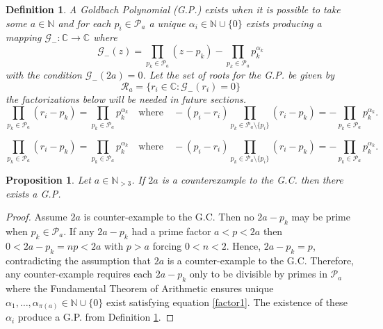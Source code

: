\documentclass[10pt,a4paper]{amsart}
\newtheorem{definition}{Definition}
\newtheorem{proposition}{Proposition}
\begin{document}
\begin{definition}\label{polyx}
A \textit{Goldbach Polynomial} (G.P.) exists when it is possible to take some $a \in \mathbb{N}$ and for each $p_i \in \mathcal{P}_a$ a unique $\alpha_i \in \mathbb{N} \cup \{0\}$ exists producing a mapping $\mathcal{G}_- : \mathbb{C} \to \mathbb{C}$ where  
\begin{equation}\label{roots}
 \mathcal{G}_-(z) = \prod_{p_k \in \mathcal{P}_a} (z - p_k) - \prod_{p_k \in \mathcal{P}_a}p_k^{\alpha_k}
 \end{equation}
 with the condition $\mathcal{G}_-(2a) = 0$. Let the set of roots for the G.P. be given by 
\begin{equation}\label{R}
\mathcal{R}_a = \{ r_i \in \mathbb{C} : \mathcal{G}_-(r_i) = 0 \}
\end{equation}
the factorizations below will be needed in future sections. 
 \begin{equation}\label{factor1}
 \prod_{p_k \in \mathcal{P}_a}(r_i - p_k) = \prod_{p_k \in \mathcal{P}_a}p_k^{\alpha_k} \quad \text{where} \quad -(p_i - r_i) \prod_{p_k \in \mathcal{P}_a \setminus\{p_i\}}(r_i - p_k) = -\prod_{p_k \in \mathcal{P}_a}p_k^{\alpha_k}.
 \end{equation}
\end{definition}

 \begin{equation}
 \prod_{p_k \in \mathcal{P}_a}(r_i - p_k) = \prod_{p_k \in \mathcal{P}_a}p_k^{\alpha_k} \quad \text{where} \quad -(p_i - r_i) \prod_{p_k \in \mathcal{P}_a \setminus\{p_i\}}(r_i - p_k) = -\prod_{p_k \in \mathcal{P}_a}p_k^{\alpha_k}.
 \end{equation}

\begin{proposition}\label{gbf}
\textit{Let $a \in \mathbb{N}_{> 3}$. If $2a$ is a counterexample to the G.C. then there exists a G.P.}
\end{proposition}

\begin{proof}
Assume $2a$ is counter-example to the G.C. Then no $2a - p_k$ may be prime when $p_k \in \mathcal{P}_a$. If any $2a - p_k$ had a prime factor $a < p < 2a$ then $0< 2a - p_k = n p < 2a$ with $p > a$ forcing $0<n < 2$. Hence, $2a - p_k = p$, contradicting the assumption that $2a$ is a counter-example to the G.C. Therefore, any counter-example requires each $2a - p_k$ only to be divisible by primes in $\mathcal{P}_a$ where the Fundamental Theorem of Arithmetic ensures unique $\alpha_1, \dots, \alpha_{\pi(a)} \in \mathbb{N}\cup \{0\}$ exist satisfying equation \ref{factor1}. The existence of these $\alpha_i$ produce a G.P. from Definition \ref{polyx}.
\end{proof}
\end{document}
